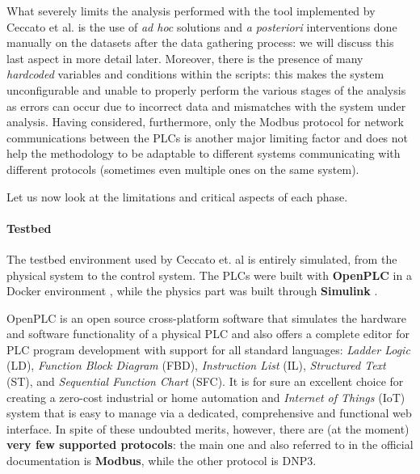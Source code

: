 \bigskip
What severely limits the analysis performed with the tool implemented by Ceccato et al. is the use of \textit{ad hoc} solutions and \textit{a posteriori} interventions done manually on the datasets after the data gathering process: we will discuss this last aspect in more detail later.\newline
Moreover, there is the presence of many \textit{hardcoded} variables and conditions within the scripts: this makes the system unconfigurable and unable to properly perform the various stages of the analysis as errors can occur due to incorrect data and mismatches with the system under analysis.\newline
Having considered, furthermore, only the Modbus protocol for network communications between the PLCs is another major limiting factor and does not help the methodology to be adaptable to different systems communicating with different protocols (sometimes even multiple ones on the same system). 

\bigskip
Let us now look at the limitations and critical aspects of each phase.

\paragraph{Testbed}
\label{par:3_testbed_limitations}
The testbed environment used by Ceccato et. al is entirely simulated, from the physical system to the control system. The PLCs were built with \textbf{OpenPLC} \cite{openplc} in a Docker environment \cite{docker}, while the physics part was built through \textbf{Simulink} \cite{simulink}.

\bigskip
OpenPLC is an open source cross-platform software that simulates the hardware and software functionality of a physical PLC and also offers a complete editor for PLC program development with support for all standard languages: \textit{Ladder Logic} (LD), \textit{Function Block Diagram} (FBD), \textit{Instruction List} (IL), \textit{Structured Text} (ST), and \textit{Sequential Function Chart} (SFC).\newline
It is for sure an excellent choice for creating a zero-cost industrial or home automation and \textit{Internet of Things} (IoT) system that is easy to manage via a dedicated, comprehensive and functional web interface. In spite of these undoubted merits, however, there are (at the moment) \textbf{very few supported protocols}: the main one and also referred to in the official documentation is \textbf{Modbus}, while the other protocol is DNP3.

